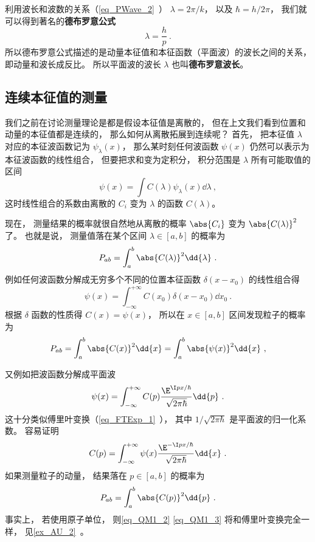 利用波长和波数的关系（\autoref{eq_PWave_2}~）
$\lambda = 2\pi/k$， 以及 $\hbar = h/2\pi$， 我们就可以得到著名的\textbf{德布罗意公式}
\begin{equation}
\lambda = \frac{h}{p}~.
\end{equation}
所以德布罗意公式描述的是动量本征值和本征函数（平面波）的波长之间的关系， 即动量和波长成反比。 所以平面波的波长 $\lambda$ 也叫\textbf{德布罗意波长}。

\subsection{连续本征值的测量}
我们之前在讨论测量理论是都是假设本征值是离散的， 但在上文我们看到位置和动量的本征值都是连续的， 那么如何从离散拓展到连续呢？ 首先， 把本征值 $\lambda$ 对应的本征波函数记为 $\psi_\lambda(x)$， 那么某时刻任何波函数 $\psi(x)$ 仍然可以表示为本征波函数的线性组合， 但要把求和变为定积分， 积分范围是 $\lambda$ 所有可能取值的区间
\begin{equation}
\psi(x) = \int C(\lambda)\psi_\lambda(x) \dd{\lambda}~,
\end{equation}
这时线性组合的系数由离散的 $C_i$ 变为 $\lambda$ 的函数 $C(\lambda)$。

现在， 测量结果的概率就很自然地从离散的概率 $\abs{C_i}$ 变为 $\abs{C(\lambda)}^2$ 了。 也就是说， 测量值落在某个区间 $\lambda \in [a, b]$ 的概率为
\begin{equation}
P_{ab} = \int_a^b \abs{C(\lambda)}^2 \dd{\lambda}~.
\end{equation}
例如任何波函数分解成无穷多个不同的位置本征函数 $\delta(x-x_0)$ 的线性组合得
\begin{equation}
\psi(x) = \int_{-\infty}^{+\infty} C(x_0) \delta(x - x_0) \dd{x_0}~.
\end{equation}
根据 $\delta$ 函数的性质得 $C(x) = \psi(x)$， 所以在 $x \in [a, b]$ 区间发现粒子的概率为
\begin{equation}
P_{ab} = \int_a^b \abs{C(x)}^2\dd{x} = \int_a^b \abs{\psi(x)}^2\dd{x}~,
\end{equation}

又例如把波函数分解成平面波
\begin{equation}\label{eq_QM1_2}
\psi(x) = \int_{-\infty}^{+\infty} C(p)\frac{\E^{\I p x/\hbar}}{\sqrt{2\pi\hbar}} \dd{p}~.
\end{equation}
这十分类似傅里叶变换（\autoref{eq_FTExp_1}~）， 其中 $1/\sqrt{2\pi\hbar}$ 是平面波的归一化系数。 容易证明
\begin{equation}\label{eq_QM1_3}
C(p) = \int_{-\infty}^{+\infty} \psi(x) \frac{\E^{-\I p x/\hbar}}{\sqrt{2\pi\hbar}} \dd{x}~.
\end{equation}
如果测量粒子的动量， 结果落在 $p \in [a, b]$ 的概率为
\begin{equation}
P_{ab} = \int_a^b \abs{C(p)}^2 \dd{p}~.
\end{equation}
事实上， 若使用原子单位， 则\autoref{eq_QM1_2} \autoref{eq_QM1_3} 将和傅里叶变换完全一样， 见\autoref{ex_AU_2}~。

